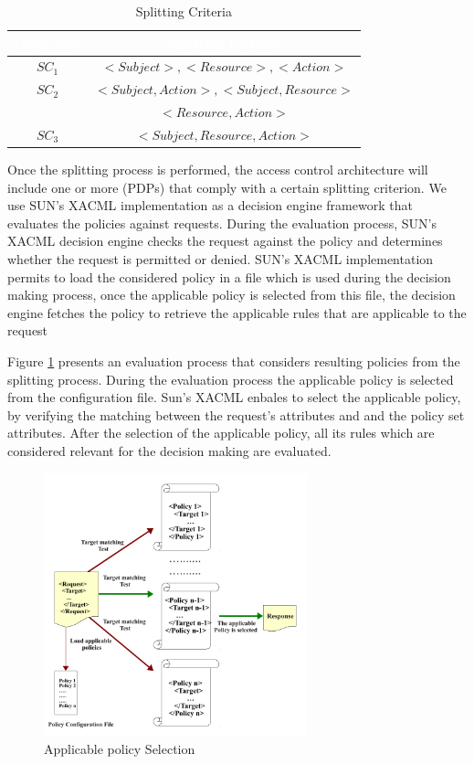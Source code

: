 \begin{table}[h!]
\centering
\setlength{\extrarowheight}{6 pt}
\begin{tabular}{|>{\small}c|>{\small}c|} 
\hline  \rowcolor{black} 
\bf
\textcolor{white}{Categories}& \bf \textcolor{white}{Splitting Criteria}\\ \hline
$SC_{1}$& {$<Subject>, <Resource>, <Action>$}\\ \hline
$SC_{2}$& {$<Subject,Action>, <Subject,Resource>$}\\&{$<Resource,Action>$}\\  \hline
$SC_{3}$& {$<Subject,Resource,Action>$}\\ \hline
\end{tabular}
\caption{Splitting Criteria}
\label{table1}\end{table}


Once the splitting process is performed, the access control architecture will include one or more (PDPs) that comply with a certain splitting criterion.
We use SUN's XACML implementation \cite{sunxacml} as a decision engine framework that evaluates the policies against requests.
During the evaluation process, SUN's XACML decision engine checks the request against the policy and determines whether the request is 
permitted or denied. SUN's XACML implementation permits to load the considered policy in a file which is used during the decision making process, once the applicable policy 
is selected from this file, the decision engine fetches the policy to retrieve the applicable rules that are applicable to the request


Figure \ref{requestevaluation} presents an evaluation process that considers resulting policies from the splitting process. 
During the evaluation process the applicable 
policy is selected from the configuration file. Sun's XACML enbales to select the applicable policy, by verifying the matching between the request's attributes
 and and the policy set attributes. 
After the selection of the applicable policy, all its rules which are considered relevant for the decision making are evaluated.

\begin{figure}[!h]
\begin{center}
\includegraphics[width=3in, height=3in]{requestevaluation}
\caption{Applicable policy Selection}
\label{requestevaluation}
\end{center}
\end{figure}


